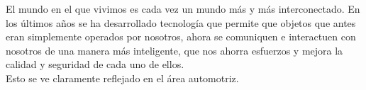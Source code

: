 \begin{introduction}
El mundo en el que vivimos es cada vez un mundo más y más interconectado. En los últimos años se ha desarrollado tecnología que permite que objetos que antes eran simplemente operados por nosotros, ahora se comuniquen e interactuen con nosotros de una manera más inteligente, que nos ahorra esfuerzos y mejora la calidad y seguridad de cada uno de ellos. \\
Esto se ve claramente reflejado en el área automotriz.
\end{introduction}
